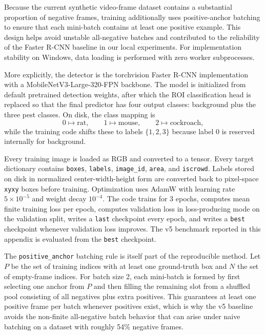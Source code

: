 \documentclass[11pt]{article}
\begin{document}
Because the current synthetic video-frame dataset contains a substantial proportion of negative frames, training additionally uses positive-anchor batching to ensure that each mini-batch contains at least one positive example. This design helps avoid unstable all-negative batches and contributed to the reliability of the Faster R-CNN baseline in our local experiments. For implementation stability on Windows, data loading is performed with zero worker subprocesses.

More explicitly, the detector is the torchvision Faster R-CNN implementation with a MobileNetV3-Large-320-FPN backbone. The model is initialized from default pretrained detection weights, after which the ROI classification head is replaced so that the final predictor has four output classes: background plus the three pest classes. On disk, the class mapping is
\[
0 \mapsto \text{rat}, \qquad 1 \mapsto \text{mouse}, \qquad 2 \mapsto \text{cockroach},
\]
while the training code shifts these to labels $\{1,2,3\}$ because label 0 is reserved internally for background.

Every training image is loaded as RGB and converted to a tensor. Every target dictionary contains \texttt{boxes}, \texttt{labels}, \texttt{image\_id}, \texttt{area}, and \texttt{iscrowd}. Labels stored on disk in normalized center-width-height form are converted back to pixel-space \texttt{xyxy} boxes before training. Optimization uses AdamW with learning rate $5 \times 10^{-5}$ and weight decay $10^{-4}$. The code trains for 3 epochs, computes mean finite training loss per epoch, computes validation loss in loss-producing mode on the validation split, writes a \texttt{last} checkpoint every epoch, and writes a \texttt{best} checkpoint whenever validation loss improves. The v5 benchmark reported in this appendix is evaluated from the \texttt{best} checkpoint.

The \texttt{positive\_anchor} batching rule is itself part of the reproducible method. Let $P$ be the set of training indices with at least one ground-truth box and $N$ the set of empty-frame indices. For batch size 2, each mini-batch is formed by first selecting one anchor from $P$ and then filling the remaining slot from a shuffled pool consisting of all negatives plus extra positives. This guarantees at least one positive frame per batch whenever positives exist, which is why the v5 baseline avoids the non-finite all-negative batch behavior that can arise under naive batching on a dataset with roughly 54\% negative frames.
\end{document}
